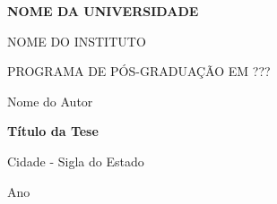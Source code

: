\documentclass[12pt,oneside]{book} %
\begin{document}
    \selectfont %






    \begin{titlepage}
        \begin{center}
            \textbf{NOME DA UNIVERSIDADE}
        \end{center}

        \vspace{-0.8cm}

        \begin{center}  
            \scriptsize{NOME DO INSTITUTO}
        \end{center}

        \vspace{-0.8cm}

        \begin{center}
            \scriptsize{PROGRAMA DE PÓS-GRADUAÇÃO EM ???}
        \end{center}

        \vspace{3cm}

        \begin{center}
            \small{Nome do Autor}
        \end{center}

        \vspace{3cm}

        \begin{center}
            \Large{\textbf{Título da Tese}} %
        \end{center}

        \vspace{12cm}

        \begin{center}
            Cidade - Sigla do Estado
        \end{center}

        \vspace{-0.8cm}
        
        \begin{center}
            Ano
        \end{center}
    \end{titlepage}
\end{document}
